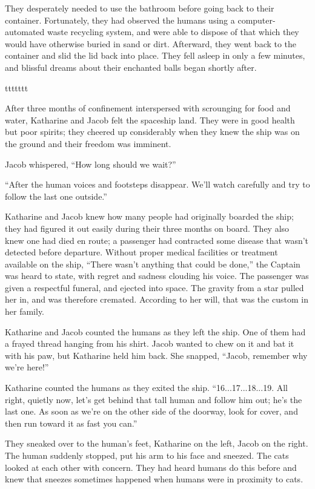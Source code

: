 They desperately needed to use the bathroom before going back to their container. Fortunately, they had observed the humans using a computer-automated waste recycling system, and were able to dispose of that which they would have otherwise buried in sand or dirt. Afterward, they went back to the container and slid the lid back into place. They fell asleep in only a few minutes, and blissful dreams about their enchanted balls began shortly after.



ttttttt


After three months of confinement interspersed with scrounging for food and water, Katharine and Jacob felt the spaceship land. They were in good health but poor spirits; they cheered up considerably when they knew the ship was on the ground and their freedom was imminent.

Jacob whispered, “How long should we wait?”

“After the human voices and footsteps disappear. We'll watch carefully and try to follow the last one outside.”

Katharine and Jacob knew how many people had originally boarded the ship; they had figured it out easily during their three months on board. They also knew one had died en route; a passenger had contracted some disease that wasn't detected before departure. Without proper medical facilities or treatment available on the ship, “There wasn't anything that could be done,” the Captain was heard to state, with regret and sadness clouding his voice. The passenger was given a respectful funeral, and ejected into space. The gravity from a star pulled her in, and was therefore cremated. According to her will, that was the custom in her family.

Katharine and Jacob counted the humans as they left the ship. One of them had a frayed thread hanging from his shirt. Jacob wanted to chew on it and bat it with his paw, but Katharine held him back. She snapped,  “Jacob, remember why we're here!”

Katharine counted the humans as they exited the ship. “16...17...18...19. All right, quietly now, let's get behind that tall human and follow him out; he's the last one. As soon as we're on the other side of the doorway, look for cover, and then run toward it as fast you can.”

They sneaked over to the human's feet, Katharine on the left, Jacob on the right. The human suddenly stopped, put his arm to his face and sneezed. The cats looked at each other with concern. They had heard humans do this before and knew that sneezes sometimes happened when humans were in proximity to cats.


